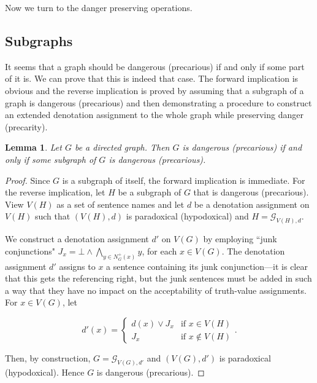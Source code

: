 \documentclass[12pt]{kluwer}
\newtheorem{lem}[thm]{Lemma}
\theoremstyle{remark}
\newcommand{\fancy}[1]{\mathcal{#1}}
\def\G{\fancy{G}}
\begin{document}
Now we turn to the danger preserving operations.

\subsection{Subgraphs}

It seems that a graph should be dangerous (precarious) if and only if some part of it is. We can prove that this is indeed that case. The forward implication is obvious and the reverse implication is proved by assuming that a subgraph of a graph is dangerous (precarious) and then demonstrating a procedure to construct an extended denotation assignment to the whole graph while preserving danger (precarity).

\begin{lem}\label{SubgraphDangerLemma}
Let $G$ be a directed graph.  Then $G$ is dangerous (precarious) if and only if some subgraph of $G$ is dangerous (precarious).
\end{lem}
\begin{proof}
Since $G$ is a subgraph of itself, the forward implication is immediate.  For the reverse implication, let $H$ be a subgraph of $G$ that is dangerous (precarious).  View $V(H)$ as a set of sentence names and let $d$ be a denotation assignment on $V(H)$ such that $(V(H), d)$ is paradoxical (hypodoxical) and
$H = \G_{V(H), d}$. \newline 

We construct a denotation assignment $d'$ on $V(G)$ by employing ``junk conjunctions" $J_x = \bot \wedge \bigwedge_{y \in N^{+}_G(x)} y$, for each $x \in V(G)$. The denotation assignment $d'$ assigns to $x$ a sentence containing its junk conjunction---it is clear that this gets the referencing right, but the junk sentences must be added in such a way that they have no impact on the acceptability of truth-value assignments. For $x \in V(G)$, let

\[d'(x) = \begin{cases}
d(x) \vee J_x & \text{if } x \in V(H) \\
J_x & \text{if } x \not \in V(H)
\end{cases}.\]

Then, by construction, $G = \G_{V(G), d'}$ and $(V(G), d')$ is paradoxical (hypodoxical).  Hence $G$ is dangerous (precarious).
\end{proof}
\end{document}
